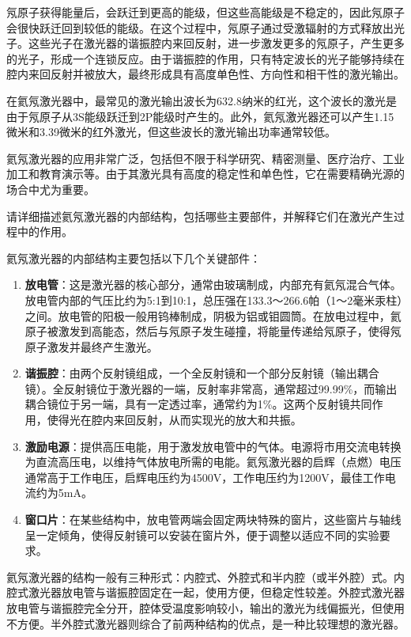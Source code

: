 \documentclass[dvipsnames, svgnames,a4paper,11pt]{article}
\begin{document}
	氖原子获得能量后，会跃迁到更高的能级，但这些高能级是不稳定的，因此氖原子会很快跃迁回到较低的能级。在这个过程中，氖原子通过受激辐射的方式释放出光子。这些光子在激光器的谐振腔内来回反射，进一步激发更多的氖原子，产生更多的光子，形成一个连锁反应。由于谐振腔的作用，只有特定波长的光子能够持续在腔内来回反射并被放大，最终形成具有高度单色性、方向性和相干性的激光输出。

	在氦氖激光器中，最常见的激光输出波长为632.8纳米的红光，这个波长的激光是由于氖原子从3S能级跃迁到2P能级时产生的。此外，氦氖激光器还可以产生1.15微米和3.39微米的红外激光，但这些波长的激光输出功率通常较低。

	氦氖激光器的应用非常广泛，包括但不限于科学研究、精密测量、医疗治疗、工业加工和教育演示等。由于其激光具有高度的稳定性和单色性，它在需要精确光源的场合中尤为重要。
	


\begin{question}
	请详细描述氦氖激光器的内部结构，包括哪些主要部件，并解释它们在激光产生过程中的作用。
\end{question}

	
	氦氖激光器的内部结构主要包括以下几个关键部件：

	\begin{enumerate}
		\item \textbf{放电管}：这是激光器的核心部分，通常由玻璃制成，内部充有氦氖混合气体。放电管内部的气压比约为5:1到10:1，总压强在133.3～266.6帕（1～2毫米汞柱）之间。放电管的阳极一般用钨棒制成，阴极为铝或钼圆筒。在放电过程中，氦原子被激发到高能态，然后与氖原子发生碰撞，将能量传递给氖原子，使得氖原子激发并最终产生激光。
		\item \textbf{谐振腔}：由两个反射镜组成，一个全反射镜和一个部分反射镜（输出耦合镜）。全反射镜位于激光器的一端，反射率非常高，通常超过99.99\%，而输出耦合镜位于另一端，具有一定透过率，通常约为1\%。这两个反射镜共同作用，使得光在腔内来回反射，从而实现光的放大和共振。
		\item \textbf{激励电源}：提供高压电能，用于激发放电管中的气体。电源将市用交流电转换为直流高压电，以维持气体放电所需的电能。氦氖激光器的启辉（点燃）电压通常高于工作电压，启辉电压约为4500V，工作电压约为1200V，最佳工作电流约为5mA。
		\item \textbf{窗口片}：在某些结构中，放电管两端会固定两块特殊的窗片，这些窗片与轴线呈一定倾角，使得反射镜可以安装在窗片外，便于调整以适应不同的实验要求。
	\end{enumerate}

	氦氖激光器的结构一般有三种形式：内腔式、外腔式和半内腔（或半外腔）式。内腔式激光器放电管与谐振腔固定在一起，使用方便，但稳定性较差。外腔式激光器放电管与谐振腔完全分开，腔体受温度影响较小，输出的激光为线偏振光，但使用不方便。半外腔式激光器则综合了前两种结构的优点，是一种比较理想的激光器。
\end{document}
